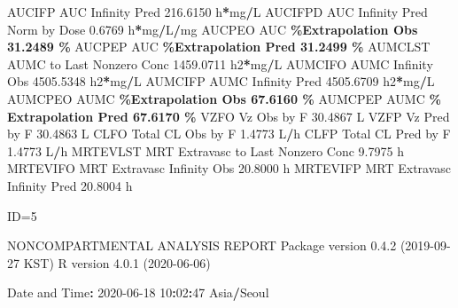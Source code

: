 \documentclass[
  10pt,
]{krantz}
\makeatletter
\newenvironment{Shaded}{\begin{snugshade}}{\end{snugshade}}
\newcommand{\DecValTok}[1]{\textcolor[rgb]{0.00,0.00,0.81}{#1}}
\newcommand{\FloatTok}[1]{\textcolor[rgb]{0.00,0.00,0.81}{#1}}
\newcommand{\NormalTok}[1]{#1}
\newcommand{\OperatorTok}[1]{\textcolor[rgb]{0.81,0.36,0.00}{\textbf{#1}}}
\newcommand{\StringTok}[1]{\textcolor[rgb]{0.31,0.60,0.02}{#1}}
\newenvironment{kframe}{%
\medskip{}
\setlength{\fboxsep}{.8em}
 \def\at@end@of@kframe{}%
 \ifinner\ifhmode%
  \def\at@end@of@kframe{\end{minipage}}%
  \begin{minipage}{\columnwidth}%
 \fi\fi%
 \def\FrameCommand##1{\hskip\@totalleftmargin \hskip-\fboxsep
 \colorbox{shadecolor}{##1}\hskip-\fboxsep
     \hskip-\linewidth \hskip-\@totalleftmargin \hskip\columnwidth}%
 \MakeFramed {\advance\hsize-\width
   \@totalleftmargin\z@ \linewidth\hsize
   \@setminipage}}%
 {\par\unskip\endMakeFramed%
 \at@end@of@kframe}
\renewenvironment{Shaded}{\begin{kframe}}{\end{kframe}}
\makeatother
\begin{document}
\begin{Shaded}
\begin{Highlighting}[]
\NormalTok{AUCIFP     AUC Infinity Pred                             }\FloatTok{216.6150}\NormalTok{ h}\OperatorTok{*}\NormalTok{mg}\OperatorTok{/}\NormalTok{L}
\NormalTok{AUCIFPD    AUC Infinity Pred Norm by Dose                  }\FloatTok{0.6769}\NormalTok{ h}\OperatorTok{*}\NormalTok{mg}\OperatorTok{/}\NormalTok{L}\OperatorTok{/}\NormalTok{mg}
\NormalTok{AUCPEO     AUC }\OperatorTok{\%Extrapolation Obs                         31.2489 \%}
\NormalTok{AUCPEP     AUC }\OperatorTok{\%Extrapolation Pred                        31.2499 \%}
\NormalTok{AUMCLST    AUMC to Last Nonzero Conc                    }\FloatTok{1459.0711}\NormalTok{ h2}\OperatorTok{*}\NormalTok{mg}\OperatorTok{/}\NormalTok{L}
\NormalTok{AUMCIFO    AUMC Infinity Obs                            }\FloatTok{4505.5348}\NormalTok{ h2}\OperatorTok{*}\NormalTok{mg}\OperatorTok{/}\NormalTok{L}
\NormalTok{AUMCIFP    AUMC Infinity Pred                           }\FloatTok{4505.6709}\NormalTok{ h2}\OperatorTok{*}\NormalTok{mg}\OperatorTok{/}\NormalTok{L}
\NormalTok{AUMCPEO    AUMC }\OperatorTok{\%Extrapolation Obs                        67.6160 \%}
\NormalTok{AUMCPEP    AUMC }\OperatorTok{\% Extrapolation Pred                      67.6170 \%}
\NormalTok{VZFO       Vz Obs by F                                    }\FloatTok{30.4867}\NormalTok{ L}
\NormalTok{VZFP       Vz Pred by F                                   }\FloatTok{30.4863}\NormalTok{ L}
\NormalTok{CLFO       Total CL Obs by F                               }\FloatTok{1.4773}\NormalTok{ L}\OperatorTok{/}\NormalTok{h}
\NormalTok{CLFP       Total CL Pred by F                              }\FloatTok{1.4773}\NormalTok{ L}\OperatorTok{/}\NormalTok{h}
\NormalTok{MRTEVLST   MRT Extravasc to Last Nonzero Conc              }\FloatTok{9.7975}\NormalTok{ h}
\NormalTok{MRTEVIFO   MRT Extravasc Infinity Obs                     }\FloatTok{20.8000}\NormalTok{ h}
\NormalTok{MRTEVIFP   MRT Extravasc Infinity Pred                    }\FloatTok{20.8004}\NormalTok{ h}





\NormalTok{ID=}\DecValTok{5}

\NormalTok{                        NONCOMPARTMENTAL ANALYSIS REPORT}
\NormalTok{                       Package version }\DecValTok{0}\NormalTok{.}\FloatTok{4.2}\NormalTok{ (}\DecValTok{2019{-}09{-}27}\NormalTok{ KST)}
\NormalTok{                          R version }\DecValTok{4}\NormalTok{.}\FloatTok{0.1}\NormalTok{ (}\DecValTok{2020{-}06{-}06}\NormalTok{)}

\NormalTok{Date and Time}\OperatorTok{:}\StringTok{ }\DecValTok{2020{-}06{-}18} \DecValTok{10}\OperatorTok{:}\DecValTok{02}\OperatorTok{:}\DecValTok{47}\NormalTok{ Asia}\OperatorTok{/}\NormalTok{Seoul}


\end{Highlighting}
\end{Shaded}
\end{document}
